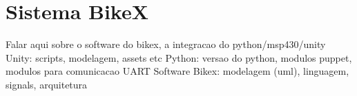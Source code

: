 \section{Sistema BikeX}
Falar aqui sobre o software do bikex, a integracao do python/msp430/unity
Unity: scripts, modelagem, assets etc
Python: versao do python, modulos puppet, modulos para comunicacao UART
Software Bikex: modelagem (uml), linguagem, signals, arquitetura